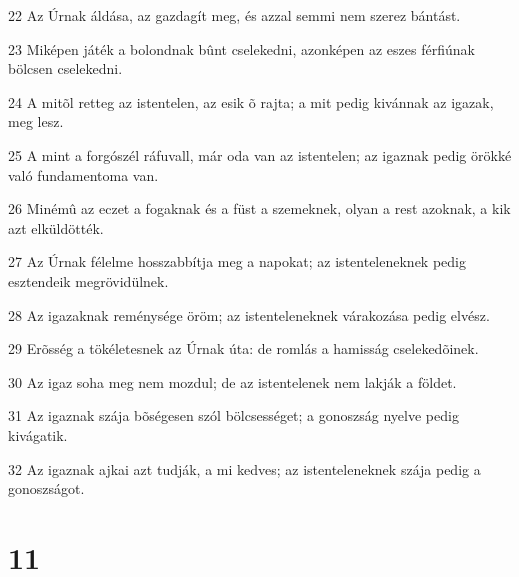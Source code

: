 \par 22 Az Úrnak áldása, az gazdagít meg, és azzal semmi nem szerez bántást.
\par 23 Miképen játék a bolondnak bûnt cselekedni, azonképen az eszes férfiúnak bölcsen cselekedni.
\par 24 A mitõl retteg az istentelen, az esik õ rajta; a mit pedig kivánnak az igazak, meg lesz.
\par 25 A mint a forgószél ráfuvall, már oda van az istentelen; az igaznak pedig örökké való fundamentoma van.
\par 26 Minémû az eczet a fogaknak és a füst a szemeknek, olyan a rest azoknak, a kik azt elküldötték.
\par 27 Az Úrnak félelme hosszabbítja meg a napokat; az istenteleneknek pedig esztendeik  megrövidülnek.
\par 28 Az igazaknak reménysége öröm; az istenteleneknek várakozása pedig elvész.
\par 29 Erõsség a tökéletesnek az Úrnak úta: de romlás a hamisság cselekedõinek.
\par 30 Az igaz soha meg nem mozdul; de az istentelenek nem lakják a földet.
\par 31 Az igaznak szája bõségesen szól bölcsességet; a gonoszság nyelve pedig kivágatik.
\par 32 Az igaznak ajkai azt tudják, a mi kedves; az istenteleneknek szája pedig a gonoszságot.

\chapter{11}

